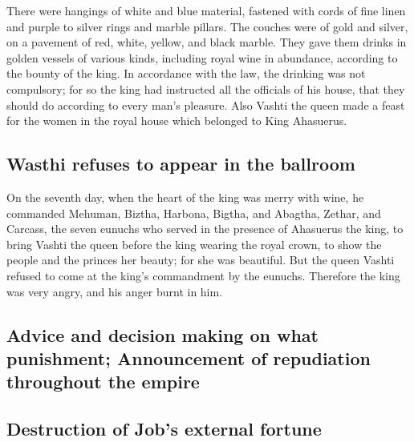  There were hangings of white and blue material, fastened
with cords of fine linen and purple to silver rings and marble pillars.
The couches were of gold and silver, on a pavement of red, white,
yellow, and black marble.  They gave them drinks in golden
vessels of various kinds, including royal wine in abundance, according
to the bounty of the king.  In accordance with the law,
the drinking was not compulsory; for so the king had instructed all the
officials of his house, that they should do according to every man's
pleasure.  Also Vashti the queen made a feast for the
women in the royal house which belonged to King Ahasuerus.

\hypertarget{wasthi-refuses-to-appear-in-the-ballroom}{%
\subsection{Wasthi refuses to appear in the
ballroom}\label{wasthi-refuses-to-appear-in-the-ballroom}}

 On the seventh day, when the heart of the king was merry
with wine, he commanded Mehuman, Biztha, Harbona, Bigtha, and Abagtha,
Zethar, and Carcass, the seven eunuchs who served in the presence of
Ahasuerus the king,  to bring Vashti the queen before the
king wearing the royal crown, to show the people and the princes her
beauty; for she was beautiful.  But the queen Vashti
refused to come at the king's commandment by the eunuchs. Therefore the
king was very angry, and his anger burnt in him.

\hypertarget{advice-and-decision-making-on-what-punishment-announcement-of-repudiation-throughout-the-empire}{%
\subsection{Advice and decision making on what punishment; Announcement
of repudiation throughout the
empire}\label{advice-and-decision-making-on-what-punishment-announcement-of-repudiation-throughout-the-empire}}

\hypertarget{destruction-of-jobs-external-fortune}{%
\subsection{Destruction of Job's external
fortune}\label{destruction-of-jobs-external-fortune}}


